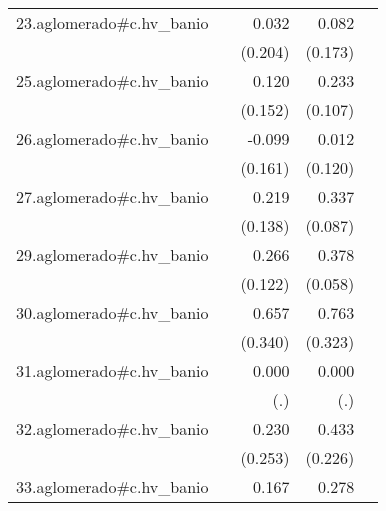 {\begin{longtable}{l*{4}{D{.}{.}{-1}}}
\addlinespace
23.aglomerado#c.hv\_banio&                     &       0.032         &       0.082         &                     \\
            &                     &     (0.204)         &     (0.173)         &                     \\
\addlinespace
25.aglomerado#c.hv\_banio&                     &       0.120         &       0.233\sym{*}  &                     \\
            &                     &     (0.152)         &     (0.107)         &                     \\
\addlinespace
26.aglomerado#c.hv\_banio&                     &      -0.099         &       0.012         &                     \\
            &                     &     (0.161)         &     (0.120)         &                     \\
\addlinespace
27.aglomerado#c.hv\_banio&                     &       0.219         &       0.337\sym{***}&                     \\
            &                     &     (0.138)         &     (0.087)         &                     \\
\addlinespace
29.aglomerado#c.hv\_banio&                     &       0.266\sym{*}  &       0.378\sym{***}&                     \\
            &                     &     (0.122)         &     (0.058)         &                     \\
\addlinespace
30.aglomerado#c.hv\_banio&                     &       0.657         &       0.763\sym{*}  &                     \\
            &                     &     (0.340)         &     (0.323)         &                     \\
\addlinespace
31.aglomerado#c.hv\_banio&                     &       0.000         &       0.000         &                     \\
            &                     &         (.)         &         (.)         &                     \\
\addlinespace
32.aglomerado#c.hv\_banio&                     &       0.230         &       0.433         &                     \\
            &                     &     (0.253)         &     (0.226)         &                     \\
\addlinespace
33.aglomerado#c.hv\_banio&                     &       0.167         &       0.278\sym{***}&                     \\

\end{longtable}}
